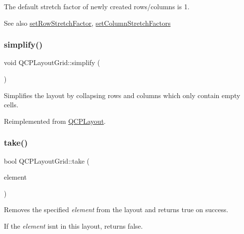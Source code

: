 The default stretch factor of newly created rows/columns is 1.

\begin{DoxySeeAlso}{See also}
\hyperlink{class_q_c_p_layout_grid_a7b0273de5369bd93d942edbaf5b166ec}{set\+Row\+Stretch\+Factor}, \hyperlink{class_q_c_p_layout_grid_a6c2591d1a7e2534ce036989543b49e57}{set\+Column\+Stretch\+Factors} 
\end{DoxySeeAlso}
\hypertarget{class_q_c_p_layout_grid_a08bba60e4acd20165526a8fd7f986b58}{}\label{class_q_c_p_layout_grid_a08bba60e4acd20165526a8fd7f986b58} 
\subsubsection{\texorpdfstring{simplify()}{simplify()}}
{\footnotesize\ttfamily void Q\+C\+P\+Layout\+Grid\+::simplify (\begin{DoxyParamCaption}{ }\end{DoxyParamCaption})\hspace{0.3cm}{\ttfamily [virtual]}}

Simplifies the layout by collapsing rows and columns which only contain empty cells. 

Reimplemented from \hyperlink{class_q_c_p_layout_a41e6ac049143866e8f8b4964efab01b2}{Q\+C\+P\+Layout}.

\hypertarget{class_q_c_p_layout_grid_a666a9fe9e92054436f9b66eba25cca0c}{}\label{class_q_c_p_layout_grid_a666a9fe9e92054436f9b66eba25cca0c} 
\subsubsection{\texorpdfstring{take()}{take()}}
{\footnotesize\ttfamily bool Q\+C\+P\+Layout\+Grid\+::take (\begin{DoxyParamCaption}\item[{\hyperlink{class_q_c_p_layout_element}{Q\+C\+P\+Layout\+Element} $\ast$}]{element }\end{DoxyParamCaption})\hspace{0.3cm}{\ttfamily [virtual]}}

Removes the specified {\itshape element} from the layout and returns true on success.

If the {\itshape element} isn\textquotesingle{}t in this layout, returns false.

